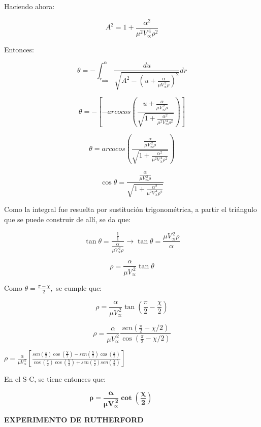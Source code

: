 \documentclass[]{article}
\begin{document}
Haciendo ahora:

\[A^{2} = 1 + \frac{\alpha^{2}}{\mu^{2}V_{\propto}^{\ 4}\rho^{2}}\]

Entonces:

\[\theta = - \int_{r_{\min}}^{\alpha\ }\frac{du}{\sqrt{A^{2} - \left( u + \frac{\alpha}{\mu V_{\propto}^{\ 2}\rho} \right)^{2}}}dr\]

\[\theta = - \left\lbrack - {arcocos}\left( \frac{u + \frac{\alpha}{\mu V_{\propto}^{\ 2}\rho}}{\sqrt{1 + \frac{\alpha^{2}}{\mu^{2}V_{\propto}^{\ 4}\rho^{2}}}} \right) \right\rbrack\]

\[\theta = {arcocos}\left( \frac{\frac{\alpha}{\mu V_{\propto}^{\ 2}\rho}}{\sqrt{1 + \frac{\alpha^{2}}{\mu^{2}V_{\propto}^{\ 4}\rho^{2}}}} \right)\]

\[\cos\theta = \frac{\frac{\alpha}{\mu V_{\propto}^{\ 2}\rho}}{\sqrt{1 + \frac{\alpha^{2}}{\mu^{2}V_{\propto}^{\ 4}\rho^{2}}}}\]

Como la integral fue resuelta por sustitución trigonométrica, a partir
el triángulo que se puede construir de allí, se da que:

\[\tan\theta = \frac{\frac{1}{1}}{\frac{\alpha}{\mu V_{\propto}^{\ 2}\rho}} \rightarrow \tan\theta = \frac{\mu V_{\propto}^{\ 2}\rho}{\alpha}\]

\[\rho = \frac{\alpha}{\mu V_{\propto}^{\ 2}}\tan\theta\]

Como \(\theta = \frac{\pi - \chi}{2},\) se cumple que:

\[\rho = \frac{\alpha}{\mu V_{\propto}^{\ 2}}\tan\left( \frac{\pi}{2} - \frac{\chi}{2} \right)\]

\[\rho = \frac{\alpha}{\mu V_{\propto}^{\ 2}}\frac{{sen}\left( \frac{\pi}{2} - \chi/2 \right)}{\cos\left( \frac{\pi}{2} - \chi/2 \right)}\]

\(\rho = \frac{\alpha}{\mu V_{\propto}^{\ 2}}\left\lbrack \frac{{sen}\left( \frac{\pi}{2} \right)\cos{\left( \frac{\chi}{2} \right) - {sen}\left( \frac{\chi}{2} \right)\cos\left( \frac{\pi}{2} \right)}}{\cos\left( \frac{\pi}{2} \right)\cos{\left( \frac{\chi}{2} \right) +}{sen}\left( \frac{\pi}{2} \right){sen}\left( \frac{\chi}{2} \right)} \right\rbrack\)

En el S-C, se tiene entonces que:

\[\mathbf{\rho =}\frac{\mathbf{\alpha}}{\mathbf{\mu}\mathbf{V}_{\mathbf{\propto}}^{\mathbf{\ 2}}}\mathbf{\cot}\left( \frac{\mathbf{\chi}}{\mathbf{2}} \right)\mathbf{\ \ \ \ \ \ \ \ \ \ \ \ \ \ }\]

\textbf{EXPERIMENTO DE RUTHERFORD}
\end{document}
